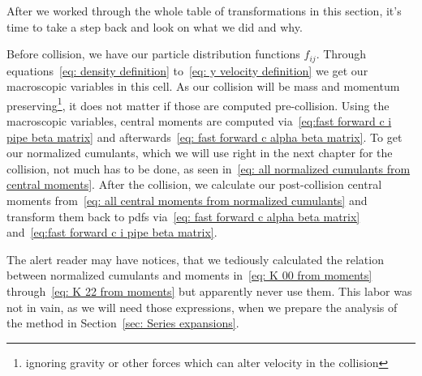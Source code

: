 
After we worked through the whole table of transformations in this section, it's time to take a step back and look on what we did and why.

Before collision, we have our particle distribution functions $f_{ij}$.
Through equations~\eqref{eq: density definition} to~\eqref{eq: y velocity definition} we get our macroscopic variables in this cell.
As our collision will be mass and momentum preserving\footnote{ignoring gravity or other forces which can alter velocity in the collision}, it does not matter if those are computed pre-collision.
Using the macroscopic variables, central moments are computed via~\eqref{eq:fast forward c i pipe beta matrix} and afterwards~\eqref{eq: fast forward c alpha beta matrix}.
To get our normalized cumulants, which we will use right in the next chapter for the collision, not much has to be done, as seen in~\eqref{eq: all normalized cumulants from central moments}.
After the collision, we calculate our post-collision central moments from~\eqref{eq: all central moments from normalized cumulants}
and transform them back to \glspl{pdf} via~\eqref{eq: fast forward c alpha beta matrix} and~\eqref{eq:fast forward c i pipe beta matrix}.

The alert reader may have notices, that we tediously calculated the relation between normalized cumulants and moments in~\eqref{eq: K 00 from moments} through~\eqref{eq: K 22 from moments} but apparently never use them.
This labor was not in vain, as we will need those expressions, when we prepare the analysis of the method in Section~\ref{sec: Series expansions}.
